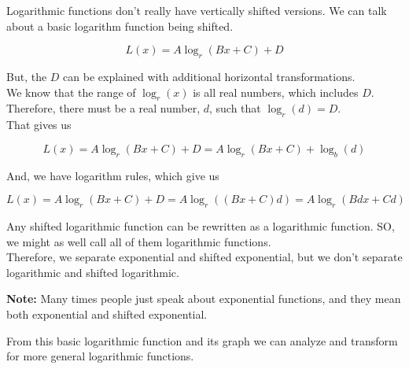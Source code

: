 \documentclass{ximera}
\begin{document}
\begin{fact}


Logarithmic functions don't really have vertically shifted versions.  We can talk about a basic logarithm function being shifted.

\[
L(x) = A \log_r(B x + C) + D
\]


But, the $D$ can be explained with additional horizontal transformations. \\


We know that the range of $\log_r(x)$ is all real numbers, which includes $D$.  Therefore, there must be a real number, $d$, such that $\log_r(d) = D$. \\


That gives us 



\[
L(x) = A \log_r(B x + C) + D = A \log_r(B x + C) + \log_b(d)
\]

And, we have logarithm rules, which give us


\[
L(x) = A \log_r(B x + C) + D = A \log_r((B x + C)d) = A \log_r(B d x + C d) 
\]


Any shifted logarithmic function can be rewritten as a logarithmic function.  SO, we might as well call all of them logarithmic functions. \\

Therefore, we separate exponential and shifted exponential, but we don't separate logarithmic and shifted logarithmic.

\end{fact}


\textbf{Note:}  Many times people just speak about exponential functions, and they mean both exponential and shifted exponential.




















From this basic logarithmic function and its graph we can analyze and transform for more general logarithmic functions.
\end{document}

